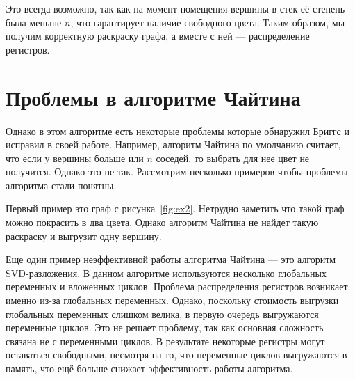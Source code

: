 \documentclass[12pt]{article}
\begin{document}
Это всегда возможно, так как на момент помещения вершины в стек её степень была меньше $n$, что гарантирует наличие свободного
цвета. Таким образом, мы получим корректную раскраску графа, а вместе с ней — распределение регистров.

\section{Проблемы в алгоритме Чайтина}

Однако в этом алгоритме есть некоторые проблемы которые обнаружил Бриггс и исправил в своей работе.
Например, алгоритм Чайтина по умолчанию считает, что если у вершины больше или $n$ соседей, то выбрать для нее цвет не получится.
Однако это не так. 
Рассмотрим несколько примеров чтобы проблемы алгоритма стали понятны.

Первый пример это граф с рисунка~\ref{fig:ex2}. Нетрудно заметить что такой граф можно покрасить в два цвета.
Однако алгоритм Чайтина не найдет такую раскраску и выгрузит одну вершину.

\begin{figure}[H]
    \centering
\end{figure} %

Еще один пример неэффективной работы алгоритма Чайтина — это алгоритм SVD-разложения.
В данном алгоритме используются несколько глобальных переменных и вложенных циклов.
Проблема распределения регистров возникает именно из-за глобальных переменных.  
Однако, поскольку стоимость выгрузки глобальных переменных слишком велика, в первую очередь выгружаются переменные циклов.
Это не решает проблему, так как основная сложность связана не с переменными циклов. 
В результате некоторые регистры могут оставаться свободными, несмотря на то, что переменные циклов выгружаются в память, что ещё больше снижает эффективность работы алгоритма.
\end{document}
